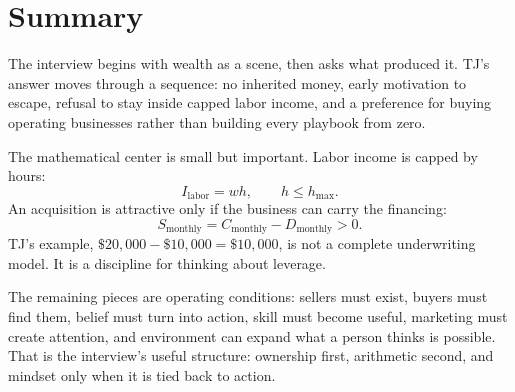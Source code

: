 \section{Summary}

The interview begins with wealth as a scene, then asks what produced it. TJ's answer moves through a sequence: no inherited money, early motivation to escape, refusal to stay inside capped labor income, and a preference for buying operating businesses rather than building every playbook from zero.

The mathematical center is small but important. Labor income is capped by hours:
\[
I_{\mathrm{labor}}=wh,\qquad h\leq h_{\max}.
\]
An acquisition is attractive only if the business can carry the financing:
\[
S_{\mathrm{monthly}}=C_{\mathrm{monthly}}-D_{\mathrm{monthly}}>0.
\]
TJ's example, \(\$20{,}000-\$10{,}000=\$10{,}000\), is not a complete underwriting model. It is a discipline for thinking about leverage.

The remaining pieces are operating conditions: sellers must exist, buyers must find them, belief must turn into action, skill must become useful, marketing must create attention, and environment can expand what a person thinks is possible. That is the interview's useful structure: ownership first, arithmetic second, and mindset only when it is tied back to action.